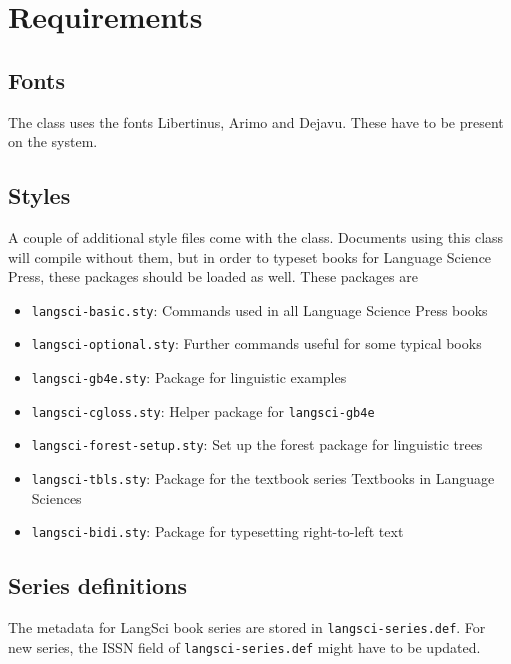 \documentclass[%
output=guidelines,
guidelines]{langscibook}
\begin{document}
\chapter{Requirements}
\section{Fonts}
The class uses the fonts Libertinus, Arimo and Dejavu. These have to be present on the system.

\section{Styles}
A couple of additional style files come with the class. Documents using this class will compile without them, but in order to typeset books for Language Science Press, these packages should be loaded as well. These packages are

\begin{itemize}
 \item \texttt{langsci-basic.sty}: Commands used in all Language Science Press books
 \item \texttt{langsci-optional.sty}: Further commands useful for some typical books
 \item \texttt{langsci-gb4e.sty}: Package for linguistic examples
 \item \texttt{langsci-cgloss.sty}: Helper package for \texttt{langsci-gb4e}
 \item \texttt{langsci-forest-setup.sty}: Set up the forest package for linguistic trees
 \item \texttt{langsci-tbls.sty}: Package for the textbook series Textbooks in Language Sciences
 \item \texttt{langsci-bidi.sty}: Package for typesetting right-to-left text

\end{itemize}

\section{Series definitions}
The metadata for LangSci book series are stored in   \texttt{langsci-series.def}.  For new series, the ISSN field of \texttt{langsci-series.def} might have to be updated.
\end{document}

